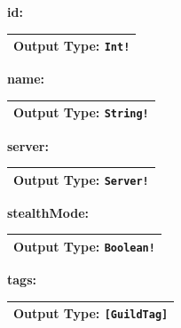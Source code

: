 \documentclass[10pt, a4paper]{memoir}
\numberwithin{equation}{section}
\theoremstyle{plain}
\theoremstyle{defp}
\theoremstyle{dotless}
\theoremstyle{definition}
\theoremstyle{dotless}
\theoremstyle{dotless}
\theoremstyle{defp}
\theoremstyle{defp}
\theoremstyle{be}          %
\theoremstyle{defp}
\newcommand\ttt[1]{\texttt{#1}}
\begin{document}
\medskip

\textbf{id:}

\begin{table}[h!]
	\centering
	\begin{tabular}{ |p{4.2cm}|p{6cm}|p{3cm}|  }
		\hline
		\multicolumn{3}{|c|}{Output Type: \ttt{Int!}} \\
		\hline
	\end{tabular}
\end{table}

\medskip

\textbf{name:}

\begin{table}[h!]
	\centering
	\begin{tabular}{ |p{4.2cm}|p{6cm}|p{3cm}|  }
		\hline
		\multicolumn{3}{|c|}{Output Type: \ttt{String!}} \\
		\hline
	\end{tabular}
\end{table}

\medskip

\textbf{server:}

\begin{table}[h!]
	\centering
	\begin{tabular}{ |p{4.2cm}|p{6cm}|p{3cm}|  }
		\hline
		\multicolumn{3}{|c|}{Output Type: \ttt{Server!}} \\
		\hline
	\end{tabular}
\end{table}

\medskip

\textbf{stealthMode:}

\begin{table}[h!]
	\centering
	\begin{tabular}{ |p{4.2cm}|p{6cm}|p{3cm}|  }
		\hline
		\multicolumn{3}{|c|}{Output Type: \ttt{Boolean!}} \\
		\hline
	\end{tabular}
\end{table}

\medskip

\textbf{tags:}

\begin{table}[h!]
	\centering
	\begin{tabular}{ |p{4.2cm}|p{6cm}|p{3cm}|  }
		\hline
		\multicolumn{3}{|c|}{Output Type: \ttt{[GuildTag]}} \\
		\hline
	\end{tabular}
\end{table}
\end{document}
